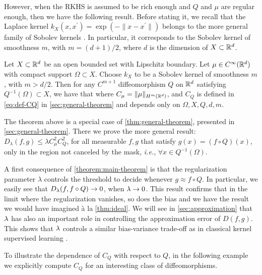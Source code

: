 However, when the RKHS is assumed to be rich enough and $Q$ and $\mu$ are regular enough, then we have the following result. Before stating it, we recall that the Laplace kernel $k_X(x,x^\prime) = \exp(-\|x-x^\prime\|)$ belongs to the more general family of Sobolev kernels \cite{wendland2004scattered}. In particular, it corresponds to the Sobolev kernel of smoothness $m$, with $m = (d+1)/2$, where $d$ is the dimension of $X \subset \mathbb R^d$.
\begin{theorem}\label{theorem:main-theorem}
Let $X \subset \mathbb R^d$ be an open bounded set with Lipschitz boundary. Let $\mu \in C^\infty(\mathbb R^d)$ with compact support $\Omega \subset X$. Choose $k_X$ to be a Sobolev kernel of smoothness $m$, with $m > d/2$. Then for any $C^{m+1}$ diffeomorphism $Q$ on $\mathbb R^d$ satisfying $Q^{-1}(\Omega) \subset X$, we have that
where $C_\mu = \|\mu\|_{H^m(\mathbb R^d)}$, and $C_Q$ is defined in \cref{eq:def-CQ} in \cref{sec:general-theorem} and depends only on $\Omega, X, Q, d, m$.
\end{theorem}
The theorem above is a special case of \cref{thm:general-theorem}, presented in \cref{sec:general-theorem}. There we prove the more general result: $D_\lambda(f,g) \leq \lambda C^2_{\mu} C^2_{Q}$, for all measurable $f, g$ that satisfy $g(x) = (f \circ Q)(x)$, only in the region not canceled by the mask, \emph{i.e.}, $\forall x \in Q^{-1}(\Omega)$.



A first consequence of \cref{theorem:main-theorem} is that the regularization parameter $\lambda$ controls the threshold to decide whenever $g \approx f \circ Q$. In particular, we easily see that $D_\lambda(f, f \circ Q) \to 0$, when $\lambda \to 0$. This result confirms that in the limit where the regularization vanishes, so does the bias and we have the result we would have imagined à la \cref{thm:ideal}. We will see in \cref{sec:approximation} that $\lambda$ has also an important role in controlling the approximation error of $D(f,g)$. This shows that $\lambda$ controls a similar bias-variance trade-off as in classical kernel supervised learning \cite{shawe-taylor2004}.

To illustrate  the dependence of $C_Q$ with respect to $Q$, in the following example we explicitly compute $C_Q$ for an interesting class of diffeomorphisms.

